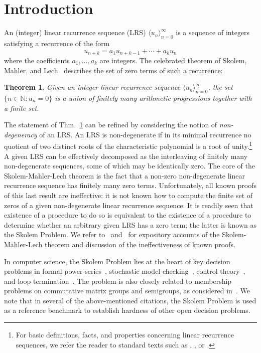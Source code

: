 \documentclass[preprint,12pt]{elsarticle}
\newtheorem{theorem}{Theorem}[section]
\begin{document}
\section{Introduction}
An (integer) linear recurrence sequence (LRS) $\langle u_n\rangle_{n=0}^\infty$
is a sequence of integers satisfying a recurrence of the form
\begin{equation}
\label{eq:1}
u_{n+k}=a_1 u_{n+k-1}+\cdots+a_k u_n 
\end{equation}
where the coefficients $a_1,\ldots,a_k$ are integers.  The celebrated
theorem of Skolem, Mahler, and Lech~\cite{Sko34,Mah35,Lec53}
describes the set of zero terms of such a recurrence:
\begin{theorem}
  \label{thm:SML}
  Given an integer linear recurrence sequence $\langle u_n\rangle_{n=0}^\infty$, the
  set $\{n\in\mathbb{N}:u_n=0\}$ is a union of finitely many
  arithmetic progressions together with a finite set.
\end{theorem}

The statement of Thm.~\ref{thm:SML} can be refined by considering
the notion of \emph{non-degeneracy} of an LRS\@.  An LRS is
non-degenerate if in its minimal recurrence no quotient of two
distinct roots of the characteristic polynomial is a root of
unity.\footnote{For basic definitions, facts, and properties concerning linear
  recurrence sequences, we refer the reader to standard texts such as
  \cite[Chaps.~1 and 2]{BOOK}, \cite[Chap.~4]{TCT}, or \cite[Chap.~4]{Stanley}.}
A
given LRS can be effectively decomposed as the interleaving of finitely many
non-degenerate sequences, some of which may be identically zero.  The
core of the Skolem-Mahler-Lech theorem is the fact that a non-zero
non-degenerate linear recurrence sequence has finitely many zero
terms.  Unfortunately, all known proofs of this last result are
ineffective: it is not known how to compute the finite set of zeros of
a given non-degenerate linear recurrence sequence.  It is readily seen
that existence of a procedure to do so is equivalent to the existence
of a procedure to determine whether an arbitrary given LRS has a zero
term; the latter is known as the Skolem Problem. We
refer to~\cite[Chap.~6]{Berstel2010NoncommutativeRS}
and~\cite[Chap.~X]{Tao08} for
  expository accounts of the Skolem-Mahler-Lech theorem and discussion
  of the ineffectiveness of known proofs.

  In computer science, the Skolem Problem lies at the heart of key
decision problems in formal power series~\cite{RS94,BRS06}, stochastic
model checking~\cite{PiribauerB20}, control theory~\cite{BlondelT00,
  FijalkowOPP019}, and loop termination~\cite{OWSiglog15}.  The
problem is also closely related to membership problems on commutative
matrix groups and semigroups, as considered in~\cite{CLZ00,KL86}.  We
note that in several of the above-mentioned citations, the Skolem
Problem is used as a reference benchmark to establish hardness of
other open decision problems.
\end{document}
